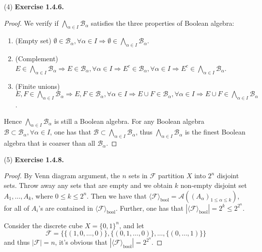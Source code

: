\documentclass[a4paper]{article}
\begin{document}
(4) {\bfseries Exercise 1.4.6.}\begin{proof}
We verify if $\bigwedge_{\alpha \in I} \mathcal{B}_\alpha$ satisfies the three properties of Boolean algebra:
\begin{enumerate}[label = (\roman*)]
    \item (Empty set) $\emptyset \in \mathcal{B}_\alpha, \forall \alpha \in I \Rightarrow \emptyset 
    \in \bigwedge_{\alpha \in I} \mathcal{B}_\alpha$.
    \item (Complement) $E \in \bigwedge_{\alpha \in I} \mathcal{B}_\alpha \Rightarrow E \in \mathcal{B}_\alpha, 
    \forall \alpha \in I \Rightarrow E^c \in \mathcal{B}_\alpha, \forall \alpha \in I \Rightarrow E^c \in 
    \bigwedge_{\alpha \in I} \mathcal{B}_\alpha$.
    \item (Finite unions) $E, F \in \bigwedge_{\alpha \in I} \mathcal{B}_\alpha \Rightarrow E, F \in \mathcal{B}_\alpha,
    \forall \alpha \in I \Rightarrow E \cup F \in \mathcal{B}_\alpha, \forall \alpha \in I \Rightarrow E \cup F \in
    \bigwedge_{\alpha \in I} \mathcal{B}_\alpha$.
\end{enumerate}
Hence $\bigwedge_{\alpha \in I} \mathcal{B}_\alpha$ is still a Boolean algebra. For any Boolean algebra $\mathcal{B} \subset 
\mathcal{B}_\alpha, \forall \alpha \in I$, one has that $\mathcal{B} \subset \bigwedge_{\alpha \in I} \mathcal{B}_\alpha$,
thus $\bigwedge_{\alpha \in I} \mathcal{B}_\alpha$ is the finest Boolean algebra that is coarser than all $\mathcal{B}_\alpha$.
\end{proof}

(5) {\bfseries Exercise 1.4.8.}\begin{proof}
By Venn diagram argument, the $n$ sets in $\mathcal{F}$ partition $X$ into $2^n$ disjoint sets. Throw away any sets 
that are empty and we obtain $k$ non-empty disjoint set $A_1, \dots, A_k$, where $0 \leq k \leq 2^n$. Then we have that
$\langle \mathcal{F} \rangle_{\mathrm{bool}} = \mathcal{A}((A_\alpha)_{1 \leq \alpha \leq k})$, for all of $A_i$'s
are contained in $\langle \mathcal{F} \rangle_{\mathrm{bool}}$. Further, one has that 
$|\langle \mathcal{F} \rangle_{\mathrm{bool}}| = 2^k \leq 2^{2^n}$. 

Consider the discrete cube $X = \{0, 1\}^n$, and let $$
\mathcal{F} = \{\{(1, 0, \dots, 0)\}, \{(0, 1, \dots, 0)\}, \dots, \{(0, \dots, 1)\}\}
$$and thus $|\mathcal{F}| = n$, it's obvious that $|\langle \mathcal{F} \rangle_{\mathrm{bool}}| = 2^{2^n}$.
\end{proof}
\end{document}
